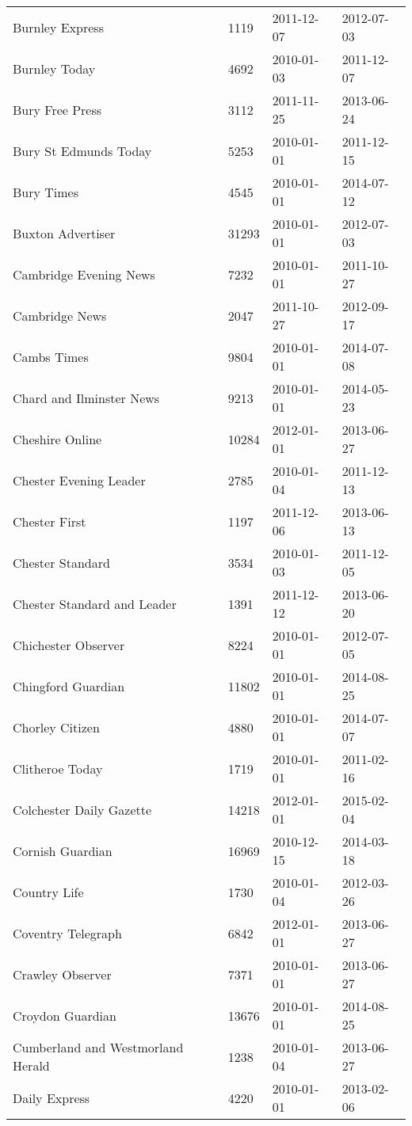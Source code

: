 \begin{longtable}{p{}p{}p{}p{}}
  Burnley Express & 1119 & 2011-12-07 & 2012-07-03 \\ 
  Burnley Today & 4692 & 2010-01-03 & 2011-12-07 \\ 
  Bury Free Press & 3112 & 2011-11-25 & 2013-06-24 \\ 
  Bury St Edmunds Today & 5253 & 2010-01-01 & 2011-12-15 \\ 
  Bury Times & 4545 & 2010-01-01 & 2014-07-12 \\ 
  Buxton Advertiser & 31293 & 2010-01-01 & 2012-07-03 \\ 
  Cambridge Evening News & 7232 & 2010-01-01 & 2011-10-27 \\ 
  Cambridge News & 2047 & 2011-10-27 & 2012-09-17 \\ 
  Cambs Times & 9804 & 2010-01-01 & 2014-07-08 \\ 
  Chard and Ilminster News & 9213 & 2010-01-01 & 2014-05-23 \\ 
  Cheshire Online & 10284 & 2012-01-01 & 2013-06-27 \\ 
  Chester Evening Leader & 2785 & 2010-01-04 & 2011-12-13 \\ 
  Chester First & 1197 & 2011-12-06 & 2013-06-13 \\ 
  Chester Standard & 3534 & 2010-01-03 & 2011-12-05 \\ 
  Chester Standard and Leader & 1391 & 2011-12-12 & 2013-06-20 \\ 
  Chichester Observer & 8224 & 2010-01-01 & 2012-07-05 \\ 
  Chingford Guardian & 11802 & 2010-01-01 & 2014-08-25 \\ 
  Chorley Citizen & 4880 & 2010-01-01 & 2014-07-07 \\ 
  Clitheroe Today & 1719 & 2010-01-01 & 2011-02-16 \\ 
  Colchester Daily Gazette & 14218 & 2012-01-01 & 2015-02-04 \\ 
  Cornish Guardian & 16969 & 2010-12-15 & 2014-03-18 \\ 
  Country Life & 1730 & 2010-01-04 & 2012-03-26 \\ 
  Coventry Telegraph & 6842 & 2012-01-01 & 2013-06-27 \\ 
  Crawley Observer & 7371 & 2010-01-01 & 2013-06-27 \\ 
  Croydon Guardian & 13676 & 2010-01-01 & 2014-08-25 \\ 
  Cumberland and Westmorland Herald & 1238 & 2010-01-04 & 2013-06-27 \\ 
  Daily Express & 4220 & 2010-01-01 & 2013-02-06 \\ 

\end{longtable}
